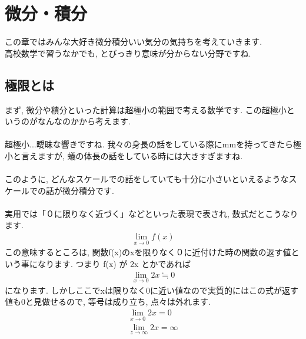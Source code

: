 \documentclass[11pt,a4paper]{jreport}
\begin{document}
\section{微分・積分}
この章ではみんな大好き微分積分いい気分の気持ちを考えていきます.\\
高校数学で習うなかでも, とびっきり意味が分からない分野ですね.\\
\subsection{極限とは}
まず, 微分や積分といった計算は超極小の範囲で考える数学です. この超極小というのがなんなのかから考えます.\\
\\
超極小...曖昧な響きですね. 我々の身長の話をしている際にmmを持ってきたら極小と言えますが, 蟻の体長の話をしている時には大きすぎますね. \\
\\
このように, どんなスケールでの話をしていても十分に小さいといえるようなスケールでの話が微分積分です.\\
\\
実用では「０に限りなく近づく」などといった表現で表され, 数式だとこうなります.
\begin{eqnarray}
\lim_{x\to0} f(x)
\end{eqnarray}
この意味するところは, 関数f(x)のxを限りなく０に近付けた時の関数の返す値という事になります. つまり f(x) が 2x とかであれば
\begin{eqnarray}
\lim_{x\to0} 2x ≒ 0
\end{eqnarray}
になります. しかしここでxは限りなく0に近い値なので実質的にはこの式が返す値も0と見做せるので, 等号は成り立ち, 点々は外れます.
\begin{eqnarray}
\lim_{x\to0} 2x = 0\\
\lim_{z\to\infty} 2x = \infty
\end{eqnarray}
\end{document}

